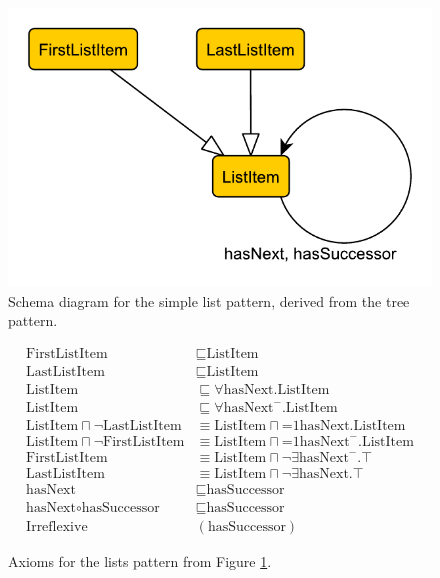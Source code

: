 \begin{figure}[t]
\begin{center}
\includegraphics[width=.4\textwidth]{list-schema-new}
\end{center}
\caption{Schema diagram for the simple list pattern, derived from the tree pattern. }\label{fig:list-new}
\end{figure}

\begin{figure}[t]\small
\begin{align}
\text{FirstListItem} &\sqsubseteq \text{ListItem}\\
\text{LastListItem} &\sqsubseteq \text{ListItem}\\
\text{ListItem} &\sqsubseteq \forall\text{hasNext}.\text{ListItem}\\
\text{ListItem} &\sqsubseteq \forall\text{hasNext}^-.\text{ListItem}\\
\text{ListItem} \sqcap \neg \text{LastListItem} &\equiv \text{ListItem} \sqcap \mathord{=}1\text{hasNext}.\text{ListItem}\\
\text{ListItem} \sqcap \neg \text{FirstListItem} &\equiv \text{ListItem} \sqcap \mathord{=}1\text{hasNext}^-.\text{ListItem}\\
\text{FirstListItem} &\equiv \text{ListItem} \sqcap \neg \exists\text{hasNext}^-.\top\\
\text{LastListItem} &\equiv \text{ListItem} \sqcap \neg \exists\text{hasNext}.\top\\ 
\text{hasNext} &\sqsubseteq \text{hasSuccessor}\\
\text{hasNext} \circ \text{hasSuccessor} &\sqsubseteq \text{hasSuccessor}\\
\text{Irreflexive}&(\text{hasSuccessor})\label{ax-list-irreflexive}
\end{align}
\caption{Axioms for the lists pattern from Figure \ref{fig:list-new}.}\label{fig:list-axioms-new}
\end{figure}

